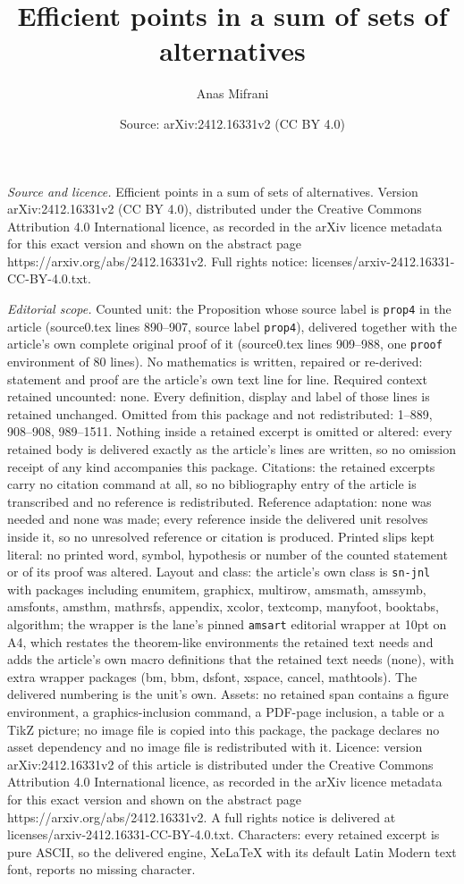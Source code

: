 \documentclass[10pt,a4paper]{amsart}
\title[Efficient points in a sum of sets of alternatives]{Efficient points in a sum of sets of alternatives}
\author{Anas Mifrani}
\date{Source: arXiv:2412.16331v2 (CC BY 4.0)}
\begin{document}
\maketitle

\noindent\emph{Source and licence.} Efficient points in a sum of sets of alternatives. Version arXiv:2412.16331v2 (CC BY 4.0), distributed under the Creative Commons Attribution 4.0 International licence, as recorded in the arXiv licence metadata for this exact version and shown on the abstract page https://arxiv.org/abs/2412.16331v2. Full rights notice: licenses/arxiv-2412.16331-CC-BY-4.0.txt.\par\smallskip

\noindent\textit{Editorial scope.} Counted unit: the Proposition whose source label is \texttt{prop4} in the article (source0.tex lines 890--907, source label \texttt{prop4}), delivered together with the article's own complete original proof of it (source0.tex lines 909--988, one \texttt{proof} environment of 80 lines). No mathematics is written, repaired or re-derived: statement and proof are the article's own text line for line. Required context retained uncounted: none. Every definition, display and label of those lines is retained unchanged. Omitted from this package and not redistributed: 1--889, 908--908, 989--1511. Nothing inside a retained excerpt is omitted or altered: every retained body is delivered exactly as the article's lines are written, so no omission receipt of any kind accompanies this package. Citations: the retained excerpts carry no citation command at all, so no bibliography entry of the article is transcribed and no reference is redistributed. Reference adaptation: none was needed and none was made; every reference inside the delivered unit resolves inside it, so no unresolved reference or citation is produced. Printed slips kept literal: no printed word, symbol, hypothesis or number of the counted statement or of its proof was altered. Layout and class: the article's own class is \texttt{sn-jnl} with packages including enumitem, graphicx, multirow, amsmath, amssymb, amsfonts, amsthm, mathrsfs, appendix, xcolor, textcomp, manyfoot, booktabs, algorithm; the wrapper is the lane's pinned \texttt{amsart} editorial wrapper at 10pt on A4, which restates the theorem-like environments the retained text needs and adds the article's own macro definitions that the retained text needs (none), with extra wrapper packages (bm, bbm, dsfont, xspace, cancel, mathtools). The delivered numbering is the unit's own. Assets: no retained span contains a figure environment, a graphics-inclusion command, a PDF-page inclusion, a table or a TikZ picture; no image file is copied into this package, the package declares no asset dependency and no image file is redistributed with it. Licence: version arXiv:2412.16331v2 of this article is distributed under the Creative Commons Attribution 4.0 International licence, as recorded in the arXiv licence metadata for this exact version and shown on the abstract page https://arxiv.org/abs/2412.16331v2. A full rights notice is delivered at licenses/arxiv-2412.16331-CC-BY-4.0.txt. Characters: every retained excerpt is pure ASCII, so the delivered engine, XeLaTeX with its default Latin Modern text font, reports no missing character.
\end{document}
